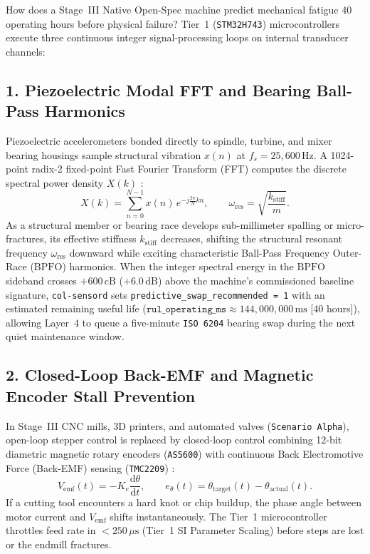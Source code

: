 How does a Stage~III Native Open-Spec machine predict mechanical fatigue 40 operating hours before physical failure? Tier~1 (\texttt{STM32H743}) microcontrollers execute three continuous integer signal-processing loops on internal transducer channels:

\subsection{1. Piezoelectric Modal FFT and Bearing Ball-Pass Harmonics}

Piezoelectric accelerometers bonded directly to spindle, turbine, and mixer bearing housings sample structural vibration $x(n)$ at $f_s = 25{,}600\,\mathrm{Hz}$. A 1024-point radix-2 fixed-point Fast Fourier Transform (FFT) computes the discrete spectral power density $X(k)$ \parencite{brincker2015introduction}:
\begin{equation}
    X(k) = \sum_{n=0}^{N-1} x(n)\, e^{-j \frac{2\pi}{N} k n}, \qquad \omega_{\mathrm{res}} = \sqrt{\frac{k_{\mathrm{stiff}}}{m}}.
    \label{eq:l2-stage3-fft}
\end{equation}
As a structural member or bearing race develops sub-millimeter spalling or micro-fractures, its effective stiffness $k_{\mathrm{stiff}}$ decreases, shifting the structural resonant frequency $\omega_{\mathrm{res}}$ downward while exciting characteristic Ball-Pass Frequency Outer-Race ($\mathrm{BPFO}$) harmonics. When the integer spectral energy in the $\mathrm{BPFO}$ sideband crosses $+600\,\mathrm{cB}$ ($+6.0\,\mathrm{dB}$) above the machine's commissioned baseline signature, \texttt{col-sensord} sets \texttt{predictive\_swap\_recommended = 1} with an estimated remaining useful life ($\mathtt{rul\_operating\_ms} \approx 144{,}000{,}000\,\mathrm{ms}$ [40 hours]), allowing Layer~4 to queue a five-minute \texttt{ISO 6204} bearing swap during the next quiet maintenance window.

\subsection{2. Closed-Loop Back-EMF and Magnetic Encoder Stall Prevention}

In Stage~III CNC mills, 3D printers, and automated valves (\texttt{Scenario Alpha}), open-loop stepper control is replaced by closed-loop control combining 12-bit diametric magnetic rotary encoders (\texttt{AS5600}) with continuous Back Electromotive Force (Back-EMF) sensing (\texttt{TMC2209}) \parencite{hughes2019electric}:
\begin{equation}
    V_{\mathrm{emf}}(t) = -K_e \frac{\mathrm{d}\theta}{\mathrm{d}t}, \qquad e_{\theta}(t) = \theta_{\mathrm{target}}(t) - \theta_{\mathrm{actual}}(t).
    \label{eq:l2-back-emf}
\end{equation}
If a cutting tool encounters a hard knot or chip buildup, the phase angle between motor current and $V_{\mathrm{emf}}$ shifts instantaneously. The Tier~1 microcontroller throttles feed rate in $< 250\,\mu\mathrm{s}$ (Tier~1 SI Parameter Scaling) before steps are lost or the endmill fractures.

